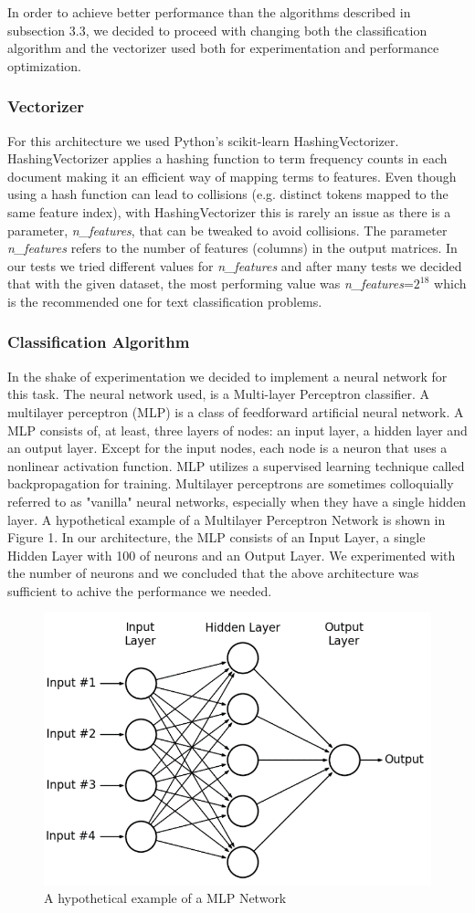 In order to achieve better performance than the algorithms described in subsection 3.3, we decided to proceed with changing both the classification algorithm and the vectorizer used both for experimentation and performance optimization.

\subsubsection{Vectorizer}
For this architecture we used Python's scikit-learn HashingVectorizer. HashingVectorizer applies a hashing function to term frequency counts in each document making it an efficient way of mapping terms to features. Even though using a hash function can lead to collisions (e.g. distinct tokens mapped to the same feature index), with HashingVectorizer this is rarely an issue as there is a parameter, \textit{n\_features}, that can be tweaked to avoid collisions. The parameter \textit{n\_features} refers to the number of features (columns) in the output matrices. In our tests we tried different values for \textit{n\_features} and after many tests we decided that with the given dataset, the most performing value was \textit{n\_features}=$2^{18}$ which is the recommended one for text classification problems.

\subsubsection{Classification Algorithm}
In the shake of experimentation we decided to implement a neural network for this task. The neural network used, is a Multi-layer Perceptron classifier. A multilayer perceptron (MLP)\cite{MLP} is a class of feedforward artificial neural network. A MLP consists of, at least, three layers of nodes: an input layer, a hidden layer and an output layer. Except for the input nodes, each node is a neuron that uses a nonlinear activation function. MLP utilizes a supervised learning technique called backpropagation for training. Multilayer perceptrons are sometimes colloquially referred to as "vanilla" neural networks, especially when they have a single hidden layer. A hypothetical example of a Multilayer Perceptron Network is shown in Figure 1. In our architecture, the MLP consists of an Input Layer, a single Hidden Layer with 100 of neurons and an Output Layer. We experimented with the number of neurons and we concluded that the above architecture was sufficient to achive the performance we needed.

\begin{figure}[H]
\centering
\includegraphics[scale=0.35]{images/MLP.png}
\caption{A hypothetical example of a MLP Network}
\end{figure}